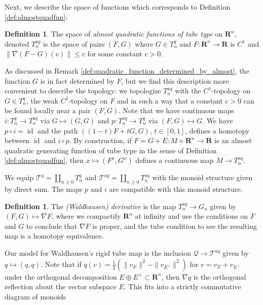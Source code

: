 \documentclass[reqno]{amsart}
\theoremstyle{theorem}
\theoremstyle{remark}
\theoremstyle{definition}
\newtheorem{definition}[corollary]{Definition}
\newcommand{\T}{\mathcal{T}}
\newcommand{\bR}{\mathbf{R}}
\newcommand{\R}{\mathbf{R}}
\newcommand{\GG}{\mathcal{G}}
\newcommand{\QQ}{\mathcal{Q}}
\newcommand{\OO}{\mathcal{O}}
\DeclareMathOperator{\id}{id}
\begin{document}
Next, we describe the space of functions which corresponds to Definition \ref{def:almostquadfun}:
\begin{definition}
The space of \emph{almost quadratic functions of tube type} on $\R^n$, denoted $T^{aq}_n$ is the space of pairs $(F,G)$ where $G\in T^q_n$ and $F:\R^n\to \R$ is $C^1$
and $\| \nabla (F-G)(v)\| \leq c$ for some constant $c>0$. 
\end{definition}
As discussed in Remark \ref{def:quadratic_function_determined_by_almost}, the function $G$ is in fact determined by $F$, but we find this description more convenient to describe the topology: we topologize $T^{aq}_n$ with the $C^1$-topology on $G\in T^q_n$, the weak $C^1$-topology on $F$
and in such a way that a constant $c>0$ can be found locally near a pair $(F,G)$.
Note that we have continuous maps $i:T^q_n\to T^{aq}_n$ via $G\mapsto (G,G)$
and $p:T^{aq}_n\to T^q_n$ via $(F,G)\mapsto G$. We have $p\circ i=\id$ and the path $((1-t)F+tG,G)$, $t\in [0,1]$,
defines a homotopy between $\id$ and $i\circ p$. By construction, if $F=G+E:M\times \R^n\to \R$
is an almost quadratic generating function of tube type in the sense of Definition \ref{def:almostquadfun}, then $x\mapsto(F^x,G^x)$ defines a continuous map
$M\to T^{aq}_n$.


We equip $\T^q=\coprod_{n \geq0} T^q_n$ and $\T^{aq}=\coprod_{n \geq0} T^{aq}_n$ with the monoid structure given by direct sum.
The maps $p$ and $i$ are compatible with this monoid structure.


\begin{definition}\label{def: derivative}
The \emph{(Waldhausen)  derivative} is the map $T^{aq}_n \to G_n$ given by $(F,G) \mapsto \nabla F$, where we compactify $\bR^n$ at infinity and use the conditions on $F$ and $G$ to conclude that $\nabla F$ is proper, and the tube condition to see the resulting map is a homotopy equivalence.
\end{definition}


Our model for Waldhausen's rigid tube map is the inclusion $\QQ \to \T^{aq}$ given by $q \mapsto (q,q)$. Note that if $q(v)=\frac{1}{2}(\|v_E\|^2 - \|v_{E^\perp} \|^2)$ for $v=v_E+v_{E^\perp}$
under the orthogonal decomposition $E \oplus E^\perp \subset \bR^n$, then $\nabla q$ is the orthogonal reflection about the vector subspace $E$. This fits into a strictly commutative diagram of monoids


\begin{center}
\end{center}
\end{document}
